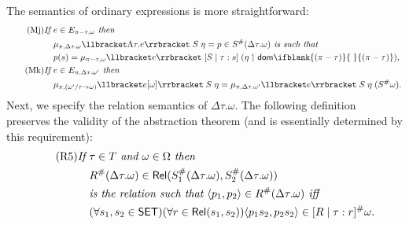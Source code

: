 \documentclass[sigplan,screen,nonacm,balance=false]{acmart}
\theoremstyle{plain}
\DeclarePairedDelimiter{\pair}{\langle}{\rangle}
\DeclarePairedDelimiter{\interp}{\llbracket}{\rrbracket}
\newcommand{\dom}[1]{\mathsf{dom}\ifblank{#1}{\;}{#1}}
\newcommand{\Rel}{\mathsf{Rel}}
\newcommand{\SET}{\mathsf{SET}}
\begin{document}
The semantics of ordinary expressions is more straightforward:
%
\begin{align*}
  \tag{Mj}
  \textit{If } & e \in E_{\pi - \tau, \omega} \textit{ then } \\
  & \mu_{\pi, \Delta \tau. \omega} \interp{\Lambda \tau. e} \; S \; \eta = p \in S^\#(\Delta \tau. \omega) \textit{ is such that } \\
  & p(s) = \mu_{\pi - \tau, \omega} \interp{e} \; [S \mid \tau: s] \; (\eta \upharpoonleft \dom{(\pi - \tau)}), \\
  \tag{Mk}
  \textit{If } & e \in E_{\pi, \Delta \tau. \omega'} \textit{ then } \\
  & \mu_{\pi, (\omega'/\tau \to \omega)} \interp{e[\omega]} \; S \; \eta = \mu_{\pi, \Delta \tau. \omega'} \interp{e} \; S \; \eta \; (S^\# \omega).
\end{align*}
%
Next, we specify the relation semantics of $\Delta \tau. \omega$.
The following definition preserves the validity of the abstraction theorem (and is essentially determined by this requirement):
%
\begin{align*}\tag{R5}\label{R5}
  \textit{If } & \tau \in T \textit{ and } \omega \in \Omega \textit{ then } \\
  & R^\#(\Delta \tau. \omega) \in \Rel(S^\#_1(\Delta \tau. \omega), S^\#_2(\Delta \tau. \omega)) \\
  & \textit{is the relation such that } \pair{p_1, p_2} \in R^\#(\Delta \tau. \omega) \textit{ iff } \\
  & (\forall s_1, s_2 \in \SET) (\forall r \in \Rel(s_1, s_2)) \pair{p_1 s_2, p_2 s_2} \in [R \mid \tau: r]^\# \omega.
\end{align*}
\end{document}
